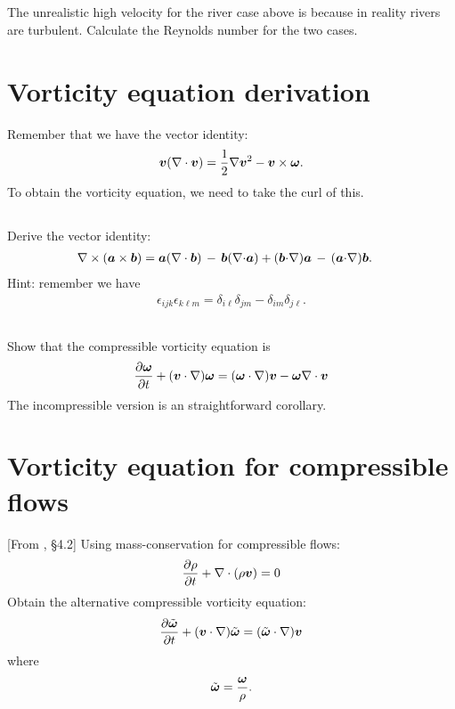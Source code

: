 \documentclass[11pt,letterpaper]{article}
\begin{document}
\subsection{}
The unrealistic high velocity for the river case above is because in reality rivers are turbulent. Calculate the Reynolds number for the two cases.

\section{Vorticity equation derivation}
Remember that we have the vector identity:
\begin{align}
    \boldsymbol{v}(\nabla\cdot\boldsymbol{v}) = \frac{1}{2}\nabla\boldsymbol{v}^2-\boldsymbol{v}\times\boldsymbol{\omega}.\label{eq:lamb_ident}
\end{align}
To obtain the vorticity equation, we need to take the curl of this. 

\subsection{}
Derive the vector identity:
\begin{align}
    \nabla\times(\boldsymbol{a}\times\boldsymbol{b}) &= \boldsymbol{a}(\nabla \cdot \boldsymbol{b}) \,-\, \boldsymbol{b}(\nabla {\cdot} \boldsymbol{a})+(\boldsymbol{b} {\cdot} \nabla) \boldsymbol{a} \,-\, (\boldsymbol{a} {\cdot} \nabla) \boldsymbol{b}.
\end{align}
Hint: remember we have
\begin{align}
    \epsilon_{ijk}\epsilon_{k\ell m} = \delta_{i\ell}\delta_{jm}-\delta_{im}\delta_{j\ell}.\label{eq:perm_prod_ident}
\end{align}

\subsection{}
Show that the compressible vorticity equation is
\begin{align}
    \frac{\partial\boldsymbol{\omega}}{\partial t}+(\boldsymbol{v}\cdot \nabla)\boldsymbol{\omega} = (\boldsymbol{\omega}\cdot \nabla)\boldsymbol{v}-\boldsymbol{\omega}\nabla\cdot\boldsymbol{v}
\end{align}
The incompressible version is an straightforward corollary. 

\section{Vorticity equation for compressible flows}
[From \cite{Vallis_17}, \S 4.2] Using mass-conservation for compressible flows:
\begin{align}
    \frac{\partial\rho}{\partial t}+\nabla\cdot(\rho\boldsymbol{v}) = 0
\end{align}
Obtain the alternative compressible vorticity equation:
\begin{align}
    \frac{\partial\tilde{\boldsymbol{\omega}}}{\partial t}+(\boldsymbol{v}\cdot \nabla)\tilde{\boldsymbol{\omega}} = (\tilde{\boldsymbol{\omega}}\cdot \nabla)\boldsymbol{v}
\end{align}
where
\begin{align}
    \tilde{\boldsymbol{\omega}} = \frac{\boldsymbol{\omega}}{\rho}.
\end{align}
\end{document}
